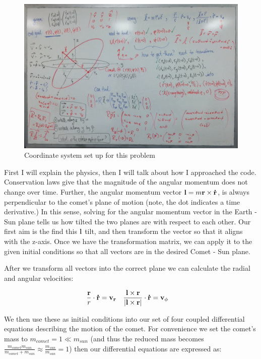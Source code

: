 \documentclass[11pt]{amsart}
\begin{document}
\begin{figure}[ht!]
\centering
\includegraphics[width=150mm]{fig2.jpg}
\caption{Coordinate system set up for this problem}
\label{overflow}
\end{figure}

First I will explain the physics, then I will talk about how I approached the code.  Conservation laws give that the magnitude of the angular momentum does not change over time.  Further, the angular momentum vector $\bold l = m \bold r \times \bold{\dot r}$, is always perpendicular to the comet's plane of motion (note, the dot indicates a time derivative.)  In this sense, solving for the angular momentum vector in the Earth - Sun plane tells us how tilted the two planes are with respect to each other.  Our first aim is the find this $\bold l$ tilt, and then transform the vector so that it aligns with the z-axis.  Once we have the transformation matrix, we can apply it to the given initial conditions so that all vectors are in the desired Comet - Sun plane.
\newline

After we transform all vectors into the correct plane we can calculate the radial and angular velocities:

\begin{align}
  \frac{\bold r}{r} \cdot \bold{\dot r} &= \bold{v_r} & \frac{\bold l \times \bold r}{| \bold l \times \bold r |} \cdot \bold{\dot r} &= \bold{v_\phi}
\end{align}
\vspace{2 mm}

We then use these as initial conditions into our set of four coupled differential equations describing the motion of the comet.  For convenience we set the comet's mass to $m_{comet}=1 \ll m_{sun}$ (and thus the reduced mass becomes $\frac{m_{comet} m_{sun}} {m_{comet} + m_{sun}} \approx \frac{m_{sun}} { m_{sun}} = 1$) then our differential equations are expressed as:
\end{document}
